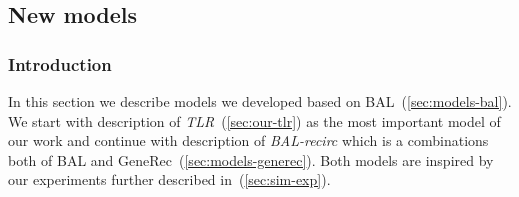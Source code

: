 \subsection{New models}
\label{sec:sim-our} 

\subsubsection*{Introduction} 
In this section we describe models we developed based on BAL~(\ref{sec:models-bal}). We start with description of \emph{TLR}~(\ref{sec:our-tlr}) as the most important model of our work and continue with description of \emph{BAL-recirc} which is a combinations both of BAL and GeneRec~(\ref{sec:models-generec}). Both models are inspired by our experiments further described in~(\ref{sec:sim-exp}). 

 



